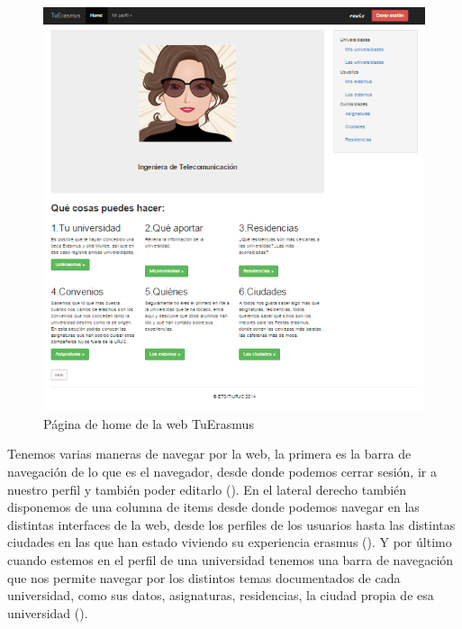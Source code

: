 \begin{figure}[htbp]
	
	\centering
	\includegraphics[scale=0.5]{./Figuras/tuerasmusPages/privatePages/home.png}
	\caption{P\'agina de home de la web TuErasmus}
	\label{fig:home}
	
\end{figure}

Tenemos varias maneras de navegar por la web, la primera es la barra de navegaci\'on de lo que es el navegador, desde donde podemos cerrar sesi\'on, ir a nuestro perfil y tambi\'en poder editarlo (\textit{}). En el lateral derecho tambi\'en disponemos de una columna de items desde donde podemos navegar en las distintas interfaces de la web, desde los perfiles de los usuarios hasta las distintas ciudades en las que han estado viviendo su experiencia erasmus (\textit{}). Y por \'ultimo cuando estemos en el perfil de una universidad tenemos una barra de navegaci\'on que nos permite navegar por los distintos temas documentados de cada universidad, como sus datos, asignaturas, residencias, la ciudad propia de esa universidad (\textit{}).\\

